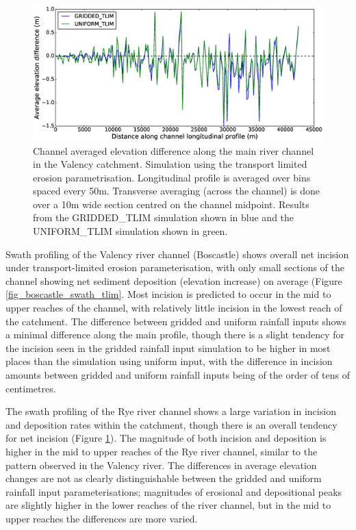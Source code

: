 \begin{figure}[htb]
\includegraphics[width=14cm]{chp06_figures_scripts/fig_swath_profile_ryedale_erode_tlim.eps}
\caption{Channel averaged elevation difference along the main river channel in the Valency catchment. Simulation using the transport limited erosion parametrisation. Longitudinal profile is averaged over bins spaced every 50m. Transverse averaging (across the channel) is done over a 10m wide section centred on the channel midpoint. Results from the GRIDDED\_TLIM simulation shown in blue and the UNIFORM\_TLIM simulation shown in green.}
\label{fig_ryedale_swath_tlim}
\end{figure}

Swath profiling of the Valency river channel (Boscastle) shows overall net incision under transport-limited erosion parameterisation, with only small sections of the channel showing net sediment deposition (elevation increase) on average (Figure \ref{fig_boscastle_swath_tlim}. Most incision is predicted to occur in the mid to upper reaches of the channel, with relatively little incision in the lowest reach of the catchment. The difference between gridded and uniform rainfall inputs shows a minimal difference along the main profile, though there is a slight tendency for the incision seen in the gridded rainfall input simulation to be higher in most places than the simulation using uniform input, with the difference in incision amounts between gridded and uniform rainfall inputs being of the order of tens of centimetres.

The swath profiling of the Rye river channel shows a large variation in incision and deposition rates within the catchment, though there is an overall tendency for net incision (Figure \ref{fig_ryedale_swath_tlim}). The magnitude of both incision and deposition is higher in the mid to upper reaches of the Rye river channel, similar to the pattern observed in the Valency river. The differences in average elevation changes are not as clearly distinguishable between the gridded and uniform rainfall input parameterisations; magnitudes of erosional and depositional peaks are slightly higher in the lower reaches of the river channel, but in the mid to upper reaches the differences are more varied. 
 
